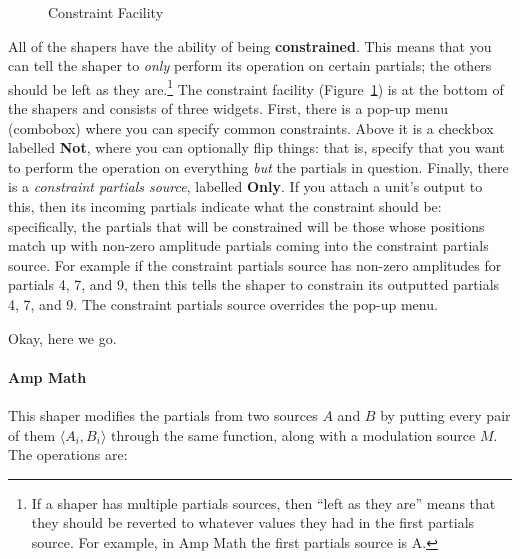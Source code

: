 \documentclass{article}
\begin{document}
\begin{figure}
\vspace{-2em}
\caption{Constraint Facility}
\vspace{-1em}
\label{constraintfacility}
\end{figure}

All of the shapers have the ability of being {\bf constrained}.  This means that you can tell the shaper to {\it only} perform its operation on certain partials; the others should be left as they are.\footnote{If a shaper has multiple partials sources, then ``left as they are'' means that they should be reverted to whatever values they had in the first partials source.  For example, in Amp Math the first partials source is A.}  The constraint facility (Figure~\ref{constraintfacility}) is at the bottom of the shapers and consists of three widgets.  First, there is a pop-up menu (combobox) where you can specify common constraints.  Above it is a checkbox labelled {\bf Not}, where you can optionally flip things: that is, specify that you want to perform the operation on everything {\it but} the partials in question.  Finally, there is a {\it constraint partials source}, labelled {\bf Only}. If you attach a unit's output to this, then its incoming partials indicate what the constraint should be: specifically, the partials that will be constrained will be those whose positions match up with non-zero amplitude partials coming into the constraint partials source. For example if the constraint partials source has non-zero amplitudes for partials 4, 7, and 9, then this tells the shaper to constrain its outputted partials 4, 7, and 9.  The constraint partials source overrides the pop-up menu.

Okay, here we go.



\paragraph{Amp Math}  This shaper modifies the partials from two sources \(A\) and \(B\) by putting every pair of them \(\langle A_i, B_i\rangle\) through the same function, along with a modulation source \(M\).  The operations are:
\end{document}
